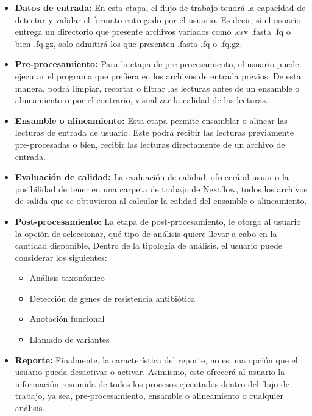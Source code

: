 \documentclass[12pt]{article}
\begin{document}
\begin{itemize}
    \item \textbf{Datos de entrada:} En esta etapa, el flujo de trabajo tendrá la capacidad de detectar y validar el formato entregado por el usuario. Es decir, si el usuario entrega un directorio que presente archivos variados como .csv .fasta .fq o bien .fq.gz, solo admitirá los que presenten .fasta .fq o .fq.gz.
    \item \textbf{Pre-procesamiento:} Para la etapa de pre-procesamiento, el usuario puede ejecutar el programa que prefiera en los archivos de entrada previos.  De esta manera, podrá limpiar, recortar o filtrar las lecturas antes de un ensamble o alineamiento o por el contrario, visualizar la calidad de las lecturas.
    \item \textbf{Ensamble o alineamiento:} Esta etapa permite  ensamblar o alinear las lecturas de entrada de usuario. Este podrá recibir las lecturas previamente pre-procesadas o bien, recibir las lecturas directamente de un archivo de entrada.
    \item \textbf{Evaluación de calidad:} La evaluación de calidad, ofrecerá al usuario la posibilidad de tener en una carpeta de trabajo de Nextflow,  todos los archivos de salida que se obtuvieron al calcular la calidad del ensamble o alineamiento.
    \item \textbf{Post-procesamiento:} La etapa de post-procesamiento, le otorga al usuario la opción de seleccionar, qué tipo de análisis quiere llevar a cabo en la cantidad disponible, Dentro de la tipología de análisis, el usuario puede considerar los siguientes:

        \begin{itemize}
            \item Análisis taxonómico
            \item Detección de genes de resistencia antibiótica
            \item Anotación funcional
            \item Llamado de variantes
        \end{itemize}
    
    \item \textbf{Reporte:} Finalmente, la característica del reporte, no es una opción que el usuario pueda desactivar o activar. Asimismo, este ofrecerá al usuario la información resumida de todos los procesos ejecutados dentro del flujo de trabajo, ya sea, pre-procesamiento, ensamble o alineamiento o cualquier análisis.
\end{itemize}
\end{document}
